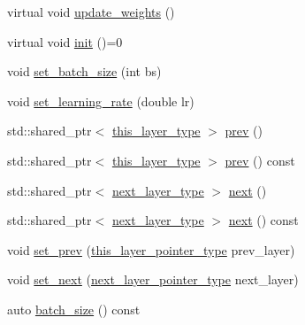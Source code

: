 \begin{DoxyCompactItemize}
\item 
virtual void \hyperlink{structbc_1_1nn_1_1Polymorphic__Layer__Base_ac4e83d85cab03ae8ac5d918fe4e08df6}{update\+\_\+weights} ()
\item 
virtual void \hyperlink{structbc_1_1nn_1_1Polymorphic__Layer__Base_a2259b176573690bfbbc93adc743212c9}{init} ()=0
\item 
void \hyperlink{structbc_1_1nn_1_1Polymorphic__Layer__Base_a4d11290c40096f27144a6ec9fa976b12}{set\+\_\+batch\+\_\+size} (int bs)
\item 
void \hyperlink{structbc_1_1nn_1_1Polymorphic__Layer__Base_a9ca5f068a02a1b132d8a90e2c307b4d9}{set\+\_\+learning\+\_\+rate} (double lr)
\item 
std\+::shared\+\_\+ptr$<$ \hyperlink{structbc_1_1nn_1_1Polymorphic__Layer__Base_a6087076d2e0a31e6bbdc2c2039c3ab52}{this\+\_\+layer\+\_\+type} $>$ \hyperlink{structbc_1_1nn_1_1Polymorphic__Layer__Base_aaecf0bed7f2e610b7b923dbc3d4a81d6}{prev} ()
\item 
std\+::shared\+\_\+ptr$<$ \hyperlink{structbc_1_1nn_1_1Polymorphic__Layer__Base_a6087076d2e0a31e6bbdc2c2039c3ab52}{this\+\_\+layer\+\_\+type} $>$ \hyperlink{structbc_1_1nn_1_1Polymorphic__Layer__Base_a0e55941ac286ccaf77b4c810a8f1cd09}{prev} () const
\item 
std\+::shared\+\_\+ptr$<$ \hyperlink{structbc_1_1nn_1_1Polymorphic__Layer__Base_ac7d70db83e8370d2975d05401713f677}{next\+\_\+layer\+\_\+type} $>$ \hyperlink{structbc_1_1nn_1_1Polymorphic__Layer__Base_afe77ff310be16c9357ea66bec8d6306b}{next} ()
\item 
std\+::shared\+\_\+ptr$<$ \hyperlink{structbc_1_1nn_1_1Polymorphic__Layer__Base_ac7d70db83e8370d2975d05401713f677}{next\+\_\+layer\+\_\+type} $>$ \hyperlink{structbc_1_1nn_1_1Polymorphic__Layer__Base_a042ca1b5f4e9c78fa9953e3f310972a5}{next} () const
\item 
void \hyperlink{structbc_1_1nn_1_1Polymorphic__Layer__Base_a4555d0376d65ee631208b5aa6f67d7f2}{set\+\_\+prev} (\hyperlink{structbc_1_1nn_1_1Polymorphic__Layer__Base_a6240b9012fcc8ed91d8a41f07d7c4bd9}{this\+\_\+layer\+\_\+pointer\+\_\+type} prev\+\_\+layer)
\item 
void \hyperlink{structbc_1_1nn_1_1Polymorphic__Layer__Base_a852126e97fd34bcc24c446615e3df3fa}{set\+\_\+next} (\hyperlink{structbc_1_1nn_1_1Polymorphic__Layer__Base_a6f8d2b06bb46d0ef96d0857df2544731}{next\+\_\+layer\+\_\+pointer\+\_\+type} next\+\_\+layer)
\item 
auto \hyperlink{structbc_1_1nn_1_1Polymorphic__Layer__Base_a107ffea414142eb7be7aa45f0387f966}{batch\+\_\+size} () const

\end{DoxyCompactItemize}
